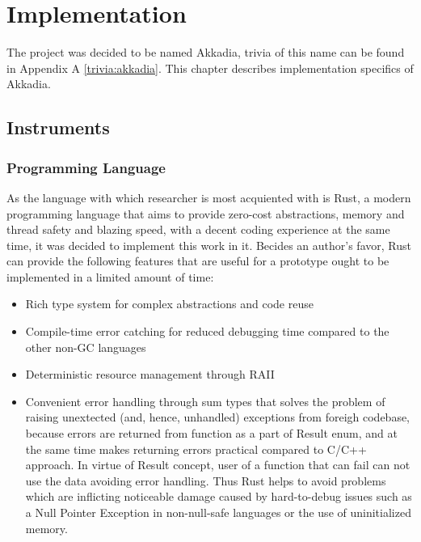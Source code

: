 \chapter{Implementation}
\label{chap:impl}

The project was decided to be named Akkadia, trivia of this name can be found in Appendix A \ref{trivia:akkadia}.
This chapter describes implementation specifics of Akkadia.

\section{Instruments}
\label{sec:impl:instruments}

\subsection{Programming Language}
As the language with which researcher is most acquiented with is Rust, a modern programming language that aims
to provide zero-cost abstractions, memory and thread safety and blazing speed,
with a decent coding experience at the same time, it was decided to implement this work in it.
Becides an author's favor, Rust can provide the following features that are useful for a prototype ought to be implemented in a limited
amount of time:
\begin{itemize}
    \item{Rich type system for complex abstractions and code reuse}
    \item{Compile-time error catching for reduced debugging time compared to the other non-GC languages}
    \item{Deterministic resource management through RAII}
    \item{
        Convenient error handling through sum types that solves the problem of raising unextected (and, hence, unhandled) exceptions from foreigh codebase,
        because errors are returned from function as a part of Result enum, and at the same time makes returning errors practical compared to C/C++ approach.
        In virtue of Result concept, user of a function that can fail can not use the data avoiding error handling.
        Thus Rust helps to avoid problems which are inflicting noticeable damage caused by hard-to-debug issues such as a Null Pointer Exception in non-null-safe languages
        or the use of uninitialized memory.
    }
\end{itemize}

